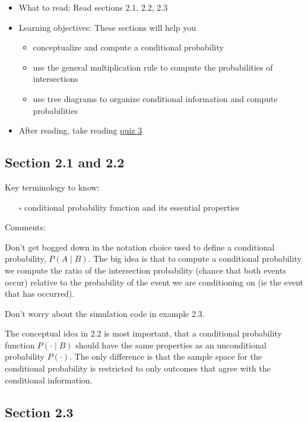 \documentclass[
  letterpaper,
]{scrbook}
\providecommand{\tightlist}{%
  \setlength{\itemsep}{0pt}\setlength{\parskip}{0pt}}\usepackage{longtable,booktabs,array}
\begin{document}
\begin{itemize}
\item
  What to read: Read sections 2.1, 2.2, 2.3
\item
  Learning objectives: These sections will help you

  \begin{itemize}
  \tightlist
  \item
    conceptualize and compute a conditional probability
  \item
    use the general multiplication rule to compute the probabilities of
    intersections
  \item
    use tree diagrams to organize conditional information and compute
    probabilities
  \end{itemize}
\item
  After reading, take reading
  \href{https://forms.gle/Gg8ZU3keRsw62JC38}{quiz 3}
\end{itemize}

\subsection*{Section 2.1 and 2.2}\label{section-2.1-and-2.2}

Key terminology to know:

\begin{itemize}
\tightlist
\item[$\square$]
  conditional probability function and its essential properties
\end{itemize}

Comments:

Don't get bogged down in the notation choice used to define a
conditional probability, \(P(A \mid B)\). The big idea is that to
compute a conditional probability we compute the ratio of the
intersection probability (chance that both events occur) relative to the
probability of the event we are conditioning on (ie the event that has
occurred).

Don't worry about the simulation code in example 2.3.

The conceptual idea in 2.2 is most important, that a conditional
probability function \(P( \cdot \mid B)\) should have the same
properties as an unconditional probability \(P(\cdot)\). The only
difference is that the sample space for the conditional probability is
restricted to only outcomes that agree with the conditional information.

\subsection*{Section 2.3}\label{section-2.3}
\end{document}
